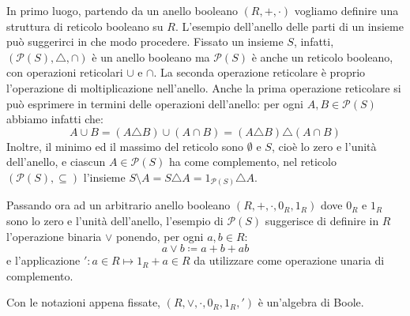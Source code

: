 In primo luogo, partendo da un anello booleano $(R,+,\cdot)$ vogliamo definire una struttura di reticolo booleano su $R$. L'esempio dell'anello delle parti di un insieme può suggerirci in che modo procedere. Fissato un insieme $S$, infatti, $(\mathcal{P}(S), \triangle, \cap)$ è un anello booleano ma $\mathcal{P}(S)$ è anche un reticolo booleano, con operazioni reticolari $\cup$ e $\cap$. La seconda operazione reticolare è proprio l'operazione di moltiplicazione nell'anello. Anche la prima operazione reticolare si può esprimere in termini delle operazioni dell'anello: per ogni $A,B \in \mathcal{P}(S)$ abbiamo infatti che:
\begin{displaymath}
	A \cup B = (A \triangle B) \cup (A \cap B) = (A \triangle B) \triangle (A \cap B)
\end{displaymath}
Inoltre, il minimo ed il massimo del reticolo sono $\emptyset$ e $S$, cioè lo zero e l'unità dell'anello, e ciascun $A \in \mathcal{P}(S)$ ha come complemento, nel reticolo $(\mathcal{P}(S),\subseteq)$ l'insieme $S \setminus A = S \triangle A = 1_{\mathcal{P}(S)} \triangle A$.

Passando ora ad un arbitrario anello booleano $(R,+,\cdot,0_{R},1_{R})$ dove $0_{R}$ e $1_{R}$ sono lo zero e l'unità dell'anello, l'esempio di $\mathcal{P}(S)$ suggerisce di definire in $R$ l'operazione binaria $\vee$ ponendo, per ogni $a,b \in R$:
\begin{equation}
	a \vee b \coloneqq a+b+ab
\end{equation}
e l'applicazione $':a \in R \mapsto 1_{R}+a \in R$ da utilizzare come operazione unaria di complemento.


\begin{propbox}
	Con le notazioni appena fissate, $(R,\vee, \cdot, 0_{R},1_{R},')$ è un'algebra di Boole.
\end{propbox}

